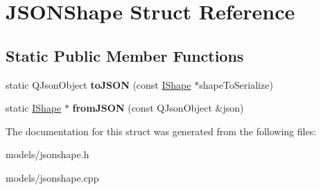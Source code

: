 \hypertarget{struct_j_s_o_n_shape}{}\section{J\+S\+O\+N\+Shape Struct Reference}
\label{struct_j_s_o_n_shape}
\subsection*{Static Public Member Functions}
\begin{DoxyCompactItemize}
\item 
\mbox{\label{struct_j_s_o_n_shape_a38bb052953becd55f29000f819aa314d}} 
static Q\+Json\+Object {\bfseries to\+J\+S\+ON} (const \mbox{\hyperlink{class_i_shape}{I\+Shape}} $\ast$shape\+To\+Serialize)
\item 
\mbox{\label{struct_j_s_o_n_shape_ae3db5716fcc492a8c2628d77ea04d454}} 
static \mbox{\hyperlink{class_i_shape}{I\+Shape}} $\ast$ {\bfseries from\+J\+S\+ON} (const Q\+Json\+Object \&json)
\end{DoxyCompactItemize}


The documentation for this struct was generated from the following files\+:\begin{DoxyCompactItemize}
\item 
models/jsonshape.\+h\item 
models/jsonshape.\+cpp\end{DoxyCompactItemize}
